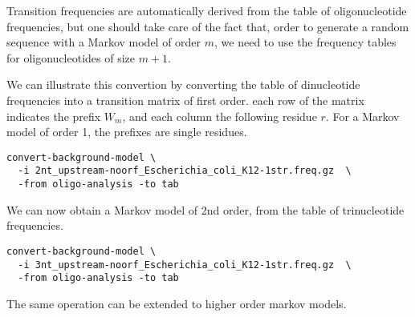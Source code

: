 Transition frequencies are automatically derived from the table of
oligonucleotide frequencies, but one should take care of the fact
that, order to generate a random sequence with a Markov model of order
$m$, we need to use the frequency tables for oligonucleotides of size
$m+1$.

We can illustrate this convertion by converting the table of
dinucleotide frequencies into a transition matrix of first order. each
row of the matrix indicates the prefix $W_m$, and each column the
following residue $r$. For a Markov model of order 1, the prefixes are
single residues.

\begin{small}
\begin{verbatim}
convert-background-model \
  -i 2nt_upstream-noorf_Escherichia_coli_K12-1str.freq.gz  \
  -from oligo-analysis -to tab
\end{verbatim}
\end{small}

We can now obtain a Markov model of 2nd order, from the table of
trinucleotide frequencies.

\begin{small}
\begin{verbatim}
convert-background-model \
  -i 3nt_upstream-noorf_Escherichia_coli_K12-1str.freq.gz  \
  -from oligo-analysis -to tab
\end{verbatim}
\end{small}

The same operation can be extended to higher order markov models.
